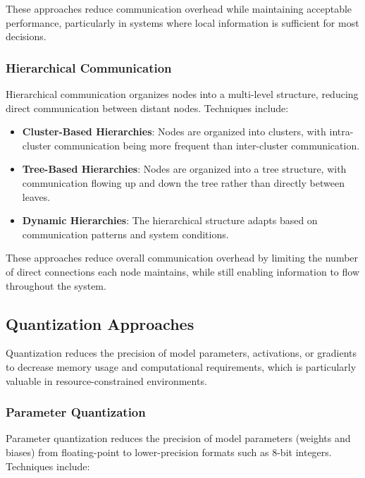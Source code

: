 \documentclass{article}
\begin{document}
These approaches reduce communication overhead while maintaining acceptable performance, particularly in systems where local information is sufficient for most decisions.

\subsubsection{Hierarchical Communication}

Hierarchical communication organizes nodes into a multi-level structure, reducing direct communication between distant nodes. Techniques include:

\begin{itemize}
    \item \textbf{Cluster-Based Hierarchies}: Nodes are organized into clusters, with intra-cluster communication being more frequent than inter-cluster communication.
    
    \item \textbf{Tree-Based Hierarchies}: Nodes are organized into a tree structure, with communication flowing up and down the tree rather than directly between leaves.
    
    \item \textbf{Dynamic Hierarchies}: The hierarchical structure adapts based on communication patterns and system conditions.
\end{itemize}

These approaches reduce overall communication overhead by limiting the number of direct connections each node maintains, while still enabling information to flow throughout the system.

\subsection{Quantization Approaches}

Quantization reduces the precision of model parameters, activations, or gradients to decrease memory usage and computational requirements, which is particularly valuable in resource-constrained environments.

\subsubsection{Parameter Quantization}

Parameter quantization reduces the precision of model parameters (weights and biases) from floating-point to lower-precision formats such as 8-bit integers. Techniques include:
\end{document}
